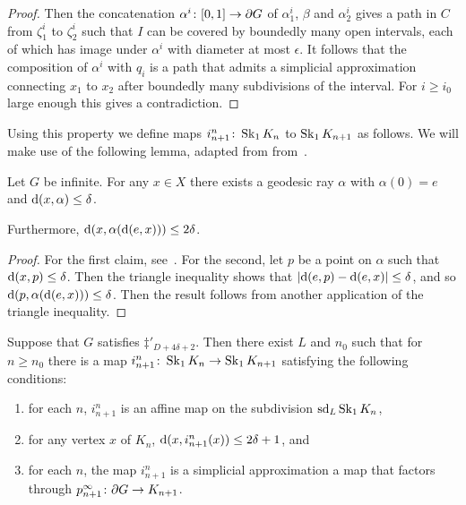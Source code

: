 \documentclass[a4paper]{article}
\begin{document}
\begin{proof}
  Then the concatenation $\alpha^i\colon[0,1]\to \partial G$ of $\alpha_1^i$,
  $\beta$ and $\alpha_2^i$ gives a path in $C$ from $\zeta_1^i$ to $\zeta_2^i$
  such that $I$ can be covered by boundedly many open intervals, each of which
  has image under $\alpha^i$ with diameter at most $\epsilon$. It follows that
  the composition of $\alpha^i$ with $q_i$ is a path that admits a simplicial
  approximation connecting $x_1$ to $x_2$ after boundedly many subdivisions of
  the interval. For $i \geq i_0$ large enough this gives a contradiction.
\end{proof}

Using this property we define maps $i^n_{n+1}\colon \operatorname{Sk}_1 K_n$ to
$\operatorname{Sk}_1K_{n+1}$ as follows.  We will make use of the following lemma, adapted
from from~\cite{bestvinamess91}.

\begin{lemma}\cite{bestvinamess91}\label{lem:near_geod_rays}
  Let $G$ be infinite. For any $x \in X$ there exists a geodesic ray $\alpha$ 
  with $\alpha(0) = e$ and $\operatorname{d}(x,\alpha) \leq \delta$. 
  
  Furthermore, $\operatorname{d}(x, \alpha(\operatorname{d}(e,x))) \leq 2\delta$.
\end{lemma}

\begin{proof}
  For the first claim, see~\cite{bestvinamess91}. For the second, let $p$ be a 
  point on $\alpha$ such that $\operatorname{d}(x, p) \leq \delta$. Then the triangle 
  inequality shows that $\left|\operatorname{d}(e,p) - \operatorname{d}(e,x)\right| \leq \delta$, and 
  so $\operatorname{d}(p, \alpha(\operatorname{d}(e,x))) \leq \delta$. Then the result 
  follows from another application of the triangle inequality.
\end{proof}

\begin{proposition}\label{prop:i_in_dimension_1}
  Suppose that $G$ satisfies $\ddag'_{D + 4\delta+2}$. Then there exist $L$ and
  $n_0$ such that for $n\geq n_0$ there is a map $i^n_{n+1}\colon \operatorname{Sk}_1 K_n
  \to \operatorname{Sk}_1 K_{n+1}$ satisfying the following conditions:
  \begin{enumerate}
    \item for each $n$, $i^n_{n+1}$ is an affine map on the subdivision
      $\operatorname{sd}_L\operatorname{Sk}_1 K_n$,
    \item for any vertex $x$ of $K_n$, $\operatorname{d}(x, i^n_{n+1}(x)) \leq 2\delta+1$,
      and
    \item for each $n$, the map $i^n_{n+1}$ is a simplicial approximation a map
      that factors through $p^\infty_{n+1}\colon \partial G \to K_{n+1}$.
  \end{enumerate}
\end{proposition}
\end{document}
